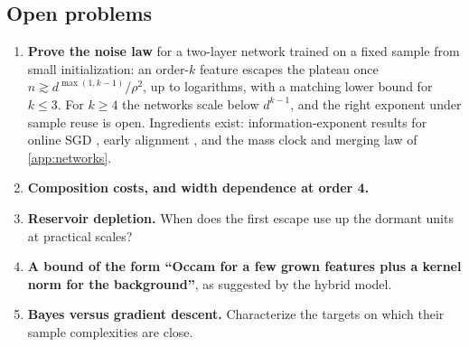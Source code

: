 \subsection{Open problems}
\begin{enumerate}
\item \textbf{Prove the noise law} for a two-layer network trained on a fixed sample from small initialization: an order-$k$ feature escapes the plateau once $n\gtrsim d^{\max(1,k-1)}/\rho^2$, up to logarithms, with a matching lower bound for $k\le3$. For $k\ge4$ the networks scale below $d^{k-1}$, and the right exponent under sample reuse is open. Ingredients exist: information-exponent results for online SGD \cite{benarous2021online}, early alignment \cite{boursier2022early}, and the mass clock and merging law of \cref{app:networks}.
\item \textbf{Composition costs, and width dependence at order 4.}
\item \textbf{Reservoir depletion.} When does the first escape use up the dormant units at practical scales?
\item \textbf{A bound of the form ``Occam for a few grown features plus a kernel norm for the background''}, as suggested by the hybrid model.
\item \textbf{Bayes versus gradient descent.} Characterize the targets on which their sample complexities are close.
\end{enumerate}
